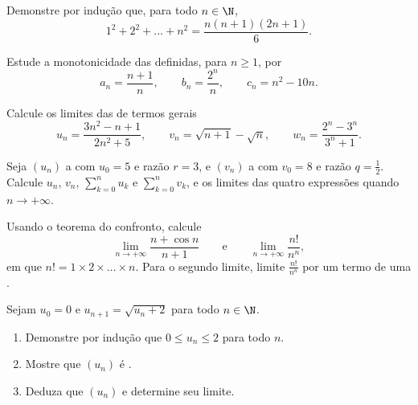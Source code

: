 \begin{exercise}[$\star$]\label{exo:g12:seq:1}
Demonstre por indução que, para todo $n \in \N$,
\[
1^2 + 2^2 + \dots + n^2 = \frac{n(n+1)(2n+1)}{6}.
\]
\end{exercise}

\begin{exercise}[$\star$]\label{exo:g12:seq:2}
Estude a monotonicidade das  definidas, para $n \geq 1$, por
\[
a_n = \frac{n+1}{n}, \qquad
b_n = \frac{2^n}{n}, \qquad
c_n = n^2 - 10n .
\]
\end{exercise}

\begin{exercise}[$\star$]\label{exo:g12:seq:3}
Calcule os limites das  de termos gerais
\[
u_n = \frac{3n^2 - n + 1}{2n^2 + 5}, \qquad
v_n = \sqrt{n+1} - \sqrt{n}, \qquad
w_n = \frac{2^n - 3^n}{3^n + 1}.
\]
\end{exercise}

\begin{exercise}[$\star$]\label{exo:g12:seq:4}
Seja $(u_n)$ a  com $u_0 = 5$ e razão $r = 3$, e
$(v_n)$ a  com $v_0 = 8$ e razão $q = \frac{1}{2}$.
Calcule $u_n$, $v_n$, $\sum_{k=0}^{n} u_k$ e $\sum_{k=0}^{n} v_k$, e os
limites das quatro expressões quando $n \to +\infty$.
\end{exercise}

\begin{exercise}[$\star\star$]\label{exo:g12:seq:5}
Usando o teorema do confronto, calcule
\[
\lim_{n\to+\infty} \frac{n + \cos n}{n + 1}
\qquad\text{e}\qquad
\lim_{n\to+\infty} \frac{n!}{n^n},
\]
em que $n! = 1 \times 2 \times \dots \times n$. Para o segundo limite,
limite $\frac{n!}{n^n}$ por um termo de uma .
\end{exercise}

\begin{exercise}[$\star\star$]\label{exo:g12:seq:6}
Sejam $u_0 = 0$ e $u_{n+1} = \sqrt{u_n + 2}$ para todo $n \in \N$.
\begin{enumerate}
  \item Demonstre por indução que $0 \leq u_n \leq 2$ para todo $n$.
  \item Mostre que $(u_n)$ é .
  \item Deduza que $(u_n)$  e determine seu limite.
\end{enumerate}
\end{exercise}

